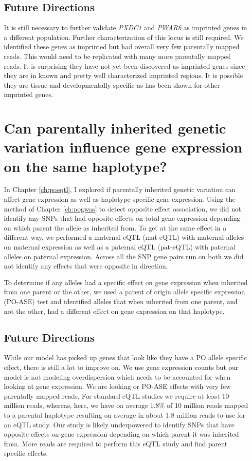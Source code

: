  \subsection{Future Directions}
It is still necessary to further validate \emph{PXDC1} and \emph{PWAR6} as imprinted genes in a different population. Further characterization of this locus is still required. We identified these genes as imprinted but had overall very few parentally mapped reads. This would need to be replicated with many more parentally mapped reads. It is surprising they have not yet been discovered as imprinted genes since they are in known and pretty well characterized imprinted regions. It is possible they are tissue and developmentally specific as has been shown for other imprinted genes\cite{Baran:2015cx}. 

\section{Can parentally inherited genetic variation influence gene expression on the same haplotype?}

In Chapter \ref{ch:poeqtl}, I explored if parentally inherited genetic variation can affect gene expression as well as haplotype specific gene expression. Using the method of Chapter \ref{ch:pogwas} to detect opposite effect association, we did not identify any SNPs that had opposite effects on total gene expression depending on which parent the allele as inherited from. To get at the same effect in a different way, we performed a maternal eQTL (mat-eQTL) with maternal alleles on maternal expression as well as a paternal eQTL (pat-eQTL) with paternal alleles on paternal expression. Across all the SNP gene pairs run on both we did not identify any effects that were opposite in direction. 

To determine if any alleles had a specific effect on gene expression when inherited from one parent or the other, we used a parent of origin allele specific expression (PO-ASE) test and identified alleles that when inherited from one parent, and not the other, had a different effect on gene expression on that haplotype. 


 \subsection{Future Directions}
 
 While our model has picked up genes that look like they have a PO allele specific effect, there is still a lot to improve on. We use gene expression counts but our model is not modeling overdispersion which needs to be accounted for when looking at gene expression. We are looking or PO-ASE effects with very few parentally mapped reads. For standard eQTL studies we require at least 10 million reads, whereas, here, we have on average 1.8\% of 10 million reads mapped to a parental haplotype resulting on average in about 1.8 million reads to use for an eQTL study. Our study is likely underpowered to identify SNPs that have opposite effects on gene expression depending on which parent it was inherited from. More reads are required to perform this eQTL study and find parent specific effects. 
 
